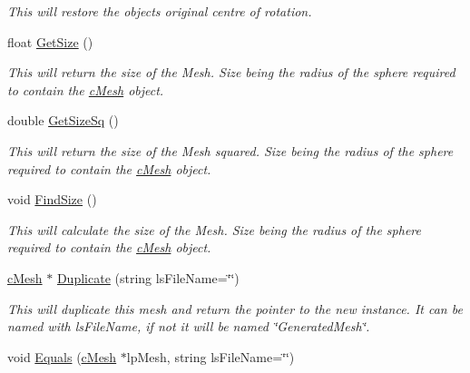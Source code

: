 \begin{DoxyCompactItemize}
\begin{DoxyCompactList}\small\item\em This will restore the objects original centre of rotation. \end{DoxyCompactList}\item 
\hypertarget{classc_mesh_a93bdde998cfebc274b7573444dc98d34}{
float \hyperlink{classc_mesh_a93bdde998cfebc274b7573444dc98d34}{GetSize} ()}
\label{classc_mesh_a93bdde998cfebc274b7573444dc98d34}

\begin{DoxyCompactList}\small\item\em This will return the size of the Mesh. Size being the radius of the sphere required to contain the \hyperlink{classc_mesh}{cMesh} object. \end{DoxyCompactList}\item 
\hypertarget{classc_mesh_a47b1bea169448ce42035a82115a6ac48}{
double \hyperlink{classc_mesh_a47b1bea169448ce42035a82115a6ac48}{GetSizeSq} ()}
\label{classc_mesh_a47b1bea169448ce42035a82115a6ac48}

\begin{DoxyCompactList}\small\item\em This will return the size of the Mesh squared. Size being the radius of the sphere required to contain the \hyperlink{classc_mesh}{cMesh} object. \end{DoxyCompactList}\item 
\hypertarget{classc_mesh_abaa10891ab82ca5988bb255fda7cfdae}{
void \hyperlink{classc_mesh_abaa10891ab82ca5988bb255fda7cfdae}{FindSize} ()}
\label{classc_mesh_abaa10891ab82ca5988bb255fda7cfdae}

\begin{DoxyCompactList}\small\item\em This will calculate the size of the Mesh. Size being the radius of the sphere required to contain the \hyperlink{classc_mesh}{cMesh} object. \end{DoxyCompactList}\item 
\hypertarget{classc_mesh_a325c1397e0594d3b19b11e4f789f93ca}{
\hyperlink{classc_mesh}{cMesh} $\ast$ \hyperlink{classc_mesh_a325c1397e0594d3b19b11e4f789f93ca}{Duplicate} (string lsFileName=\char`\"{}\char`\"{})}
\label{classc_mesh_a325c1397e0594d3b19b11e4f789f93ca}

\begin{DoxyCompactList}\small\item\em This will duplicate this mesh and return the pointer to the new instance. It can be named with lsFileName, if not it will be named \char`\"{}GeneratedMesh\char`\"{}. \end{DoxyCompactList}\item 
\hypertarget{classc_mesh_a637f8906a64eef54f320b59e8064a725}{
void \hyperlink{classc_mesh_a637f8906a64eef54f320b59e8064a725}{Equals} (\hyperlink{classc_mesh}{cMesh} $\ast$lpMesh, string lsFileName=\char`\"{}\char`\"{})}
\label{classc_mesh_a637f8906a64eef54f320b59e8064a725}


\end{DoxyCompactItemize}
